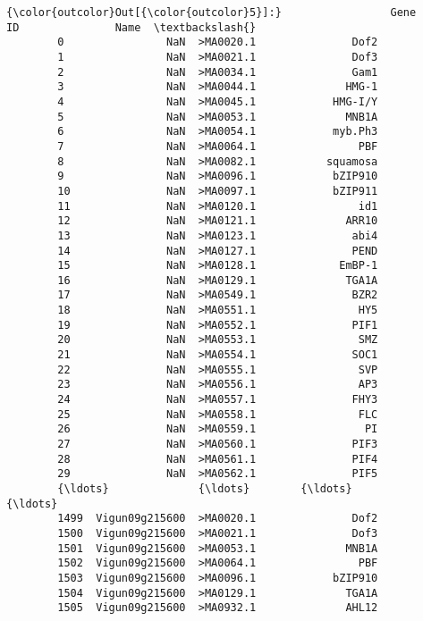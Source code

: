 \documentclass[11pt]{article}
\begin{document}
\begin{Verbatim}[commandchars=\\\{\}]
{\color{outcolor}Out[{\color{outcolor}5}]:}                 Gene         ID               Name  \textbackslash{}
        0                NaN  >MA0020.1               Dof2   
        1                NaN  >MA0021.1               Dof3   
        2                NaN  >MA0034.1               Gam1   
        3                NaN  >MA0044.1              HMG-1   
        4                NaN  >MA0045.1            HMG-I/Y   
        5                NaN  >MA0053.1              MNB1A   
        6                NaN  >MA0054.1            myb.Ph3   
        7                NaN  >MA0064.1                PBF   
        8                NaN  >MA0082.1           squamosa   
        9                NaN  >MA0096.1            bZIP910   
        10               NaN  >MA0097.1            bZIP911   
        11               NaN  >MA0120.1                id1   
        12               NaN  >MA0121.1              ARR10   
        13               NaN  >MA0123.1               abi4   
        14               NaN  >MA0127.1               PEND   
        15               NaN  >MA0128.1             EmBP-1   
        16               NaN  >MA0129.1              TGA1A   
        17               NaN  >MA0549.1               BZR2   
        18               NaN  >MA0551.1                HY5   
        19               NaN  >MA0552.1               PIF1   
        20               NaN  >MA0553.1                SMZ   
        21               NaN  >MA0554.1               SOC1   
        22               NaN  >MA0555.1                SVP   
        23               NaN  >MA0556.1                AP3   
        24               NaN  >MA0557.1               FHY3   
        25               NaN  >MA0558.1                FLC   
        26               NaN  >MA0559.1                 PI   
        27               NaN  >MA0560.1               PIF3   
        28               NaN  >MA0561.1               PIF4   
        29               NaN  >MA0562.1               PIF5   
        {\ldots}              {\ldots}        {\ldots}                {\ldots}   
        1499  Vigun09g215600  >MA0020.1               Dof2   
        1500  Vigun09g215600  >MA0021.1               Dof3   
        1501  Vigun09g215600  >MA0053.1              MNB1A   
        1502  Vigun09g215600  >MA0064.1                PBF   
        1503  Vigun09g215600  >MA0096.1            bZIP910   
        1504  Vigun09g215600  >MA0129.1              TGA1A   
        1505  Vigun09g215600  >MA0932.1              AHL12   

\end{Verbatim}
\end{document}
